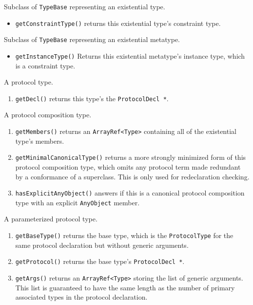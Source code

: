 \documentclass[../generics]{subfiles}
\begin{document}
Subclass of \texttt{TypeBase} representing an existential type.
\begin{itemize}
\item \texttt{getConstraintType()} returns this existential type's constraint type.
\end{itemize}

Subclass of \texttt{TypeBase} representing an existential metatype.
\begin{itemize}
\item \texttt{getInstanceType()} Returns this existential metatype's instance type, which is a constraint type.
\end{itemize}

A protocol type.
\begin{enumerate}
\item \texttt{getDecl()} returns this type's the \texttt{ProtocolDecl *}.
\end{enumerate}

A protocol composition type.
\begin{enumerate}
\item \texttt{getMembers()} returns an \texttt{ArrayRef<Type>} containing all of the existential type's members.
\item \texttt{getMinimalCanonicalType()} returns a more strongly minimized form of this protocol composition type, which omits any protocol term made redundant by a conformance of a superclass. This is only used for redeclaration checking.
\item \texttt{hasExplicitAnyObject()} answers if this is a canonical protocol composition type with an explicit \texttt{AnyObject} member.
\end{enumerate}

A parameterized protocol type.
\begin{enumerate}
\item \texttt{getBaseType()} returns the base type, which is the \texttt{ProtocolType} for the same protocol declaration but without generic arguments.
\item \texttt{getProtocol()} returns the base type's \texttt{ProtocolDecl *}.
\item \texttt{getArgs()} returns an \texttt{ArrayRef<Type>} storing the list of generic arguments. This list is guaranteed to have the same length as the number of primary associated types in the protocol declaration.
\end{enumerate}
\end{document}
